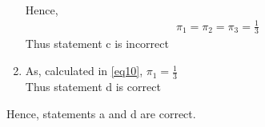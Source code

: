 \documentclass[journal,12pt,twocolumn]{IEEEtran}
\begin{document}
\begin{enumerate}
{\begin{align}
    \end{align}
    Hence,
    \begin{align}
    \pi_1=\pi_2=\pi_3=\frac{1}{3} \label{eq10}
    \end{align}
    Thus statement c is incorrect
    }\\
    \item{As, calculated in \ref{eq10}, $\pi_1=\frac{1}{3}$\\
    Thus statement d is correct}
    \end{enumerate}
Hence, statements a and d are correct.
\end{document}
